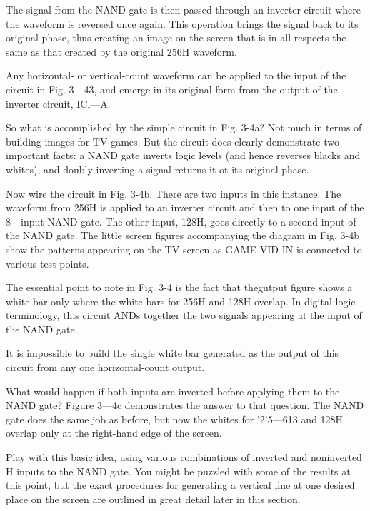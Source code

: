 \documentclass[11pt]{book}              %
\begin{document}
The signal from the NAND gate is then passed through an inverter circuit where the waveform is reversed once again. This operation brings the signal back to its original phase, thus creating an image on the screen that is in all respects the same as that created by the original 256H waveform.

Any horizontal- or vertical-count waveform can be applied to the input of the circuit in Fig. 3—43, and emerge in its original form from the output of the inverter circuit, ICl—A.


So what is accomplished by the simple circuit in Fig. 3-4a? Not much in terms of building images for TV games. But the circuit does clearly demonstrate two important facts: a NAND gate inverts logic levels (and hence reverses blacks and whites), and doubly inverting a signal returns it ot its original phase.


Now wire the circuit in Fig. 3-4b. There are two inputs in this instance. The waveform from 256H is applied to an inverter circuit and then to one input of the 8—input NAND gate. The other input, 128H, goes directly to a second input of the NAND gate. The little screen figures accompanying the diagram in Fig. 3-4b show the patterns appearing on the TV screen as GAME VID IN is connected to various test points.

The essential point to note in Fig. 3-4 is the fact that thegutput figure shows a white bar only where the white bars for 256H and 128H overlap. In digital logic terminology, this circuit ANDs together the two signals appearing at the input of the NAND gate.

It is impossible to build the single white bar generated as the output of this circuit from any one horizontal-count output.

What would happen if both inputs are inverted before applying them to the NAND gate? Figure 3—4c demonstrates the answer to that question. The NAND gate does the same job as before, but now the whites for '2'5—613 and 128H overlap only at the right-hand edge of the screen.

Play with this basic idea, using various combinations of inverted and noninverted H inputs to the NAND gate. You might be puzzled with some of the results at this point, but the exact procedures for generating a vertical line at one desired place on the screen are outlined in great detail later in this section.
\end{document}
